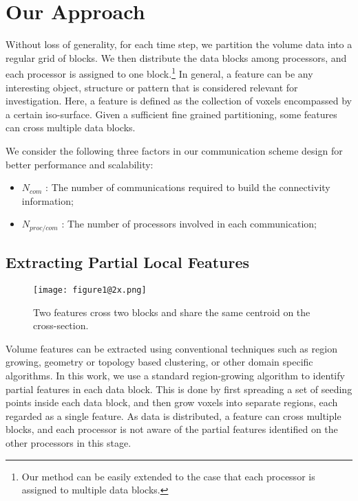 \section{Our Approach}

Without loss of generality, for each time step, we partition the volume data into a regular grid of blocks. We then distribute the data blocks among processors, and each processor is assigned to one block.\footnote{Our method can be easily extended to the case that each processor is assigned to multiple data blocks.} In general, a feature can be any interesting object, structure or pattern that is considered relevant for investigation. Here, a feature is defined as the collection of voxels encompassed by a certain iso-surface. Given a sufficient fine grained partitioning, some features can cross multiple data blocks.

We consider the following three factors in our communication scheme design for better performance and scalability:

\begin{itemize}
  \item $N_{com}$ : The number of communications required to build the connectivity information;
  \item $N_{proc/com}$ : The number of processors involved in each communication;
\end{itemize} 


\subsection{Extracting Partial Local Features}

\begin{figure}[t]
	\centering
	\texttt{[image: figure1@2x.png]}
	\caption{Two features cross two blocks and share the same centroid on the cross-section.}
	\label{fig:special}
\end{figure}

Volume features can be extracted using conventional techniques such as region growing, geometry or topology based clustering, or other domain specific algorithms. In this work, we use a standard region-growing algorithm
\cite{Lohmann1998} to identify partial features in each data block. This is done by first spreading a set of seeding points inside each data block, and then grow voxels into separate regions, each regarded as a single feature. As data is distributed, a feature can cross multiple blocks, and each processor is not aware of the partial features identified on the other processors in this stage. 

